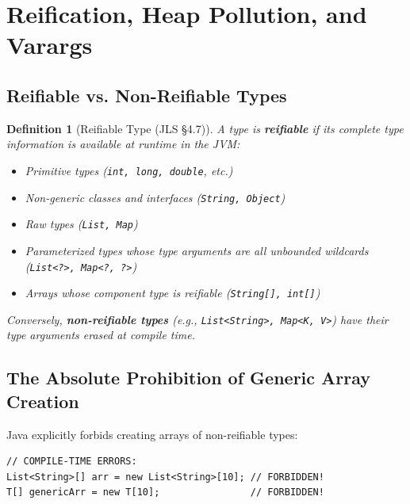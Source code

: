 \documentclass[10pt,journal,compsoc,onecolumn]{IEEEtran}
\newtheorem{definition}[theorem]{Definition}
\begin{document}
\section{Reification, Heap Pollution, and Varargs}
\label{sec:reification}

\subsection{Reifiable vs. Non-Reifiable Types}
\begin{definition}[Reifiable Type (JLS \S4.7)]
A type is \textbf{reifiable} if its complete type information is available at runtime in the JVM:
\begin{itemize}
    \item Primitive types (\texttt{int, long, double}, etc.)
    \item Non-generic classes and interfaces (\texttt{String, Object})
    \item Raw types (\texttt{List, Map})
    \item Parameterized types whose type arguments are all unbounded wildcards (\texttt{List<?>, Map<?, ?>})
    \item Arrays whose component type is reifiable (\texttt{String[], int[]})
\end{itemize}
Conversely, \textbf{non-reifiable types} (e.g., \texttt{List<String>, Map<K, V>}) have their type arguments erased at compile time.
\end{definition}

\subsection{The Absolute Prohibition of Generic Array Creation}
Java explicitly forbids creating arrays of non-reifiable types:
\begin{lstlisting}
// COMPILE-TIME ERRORS:
List<String>[] arr = new List<String>[10]; // FORBIDDEN!
T[] genericArr = new T[10];                // FORBIDDEN!
\end{lstlisting}
\end{document}

